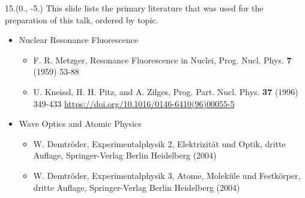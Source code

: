 \begin{textblock}{15.}(0., -5.)
    This slide lists the primary literature that was used for the preparation of this talk, ordered by topic.

    \begin{itemize}
        \item Nuclear Resonance Fluorescence
        \begin{itemize}
            \item F. R. Metzger, Resonance Fluorescence in Nuclei, Prog. Nucl. Phys. \textbf{7} (1959) 53-88
            \item U. Kneissl, H. H. Pitz, and A. Zilges, Prog. Part. Nucl. Phys. \textbf{37} (1996) 349-433 \url{https://doi.org/10.1016/0146-6410(96)00055-5}
        \end{itemize}
        \item Wave Optics and Atomic Physics
        \begin{itemize}
            \item W. Demtr\"oder, Experimentalphysik 2, Elektrizit\"at und Optik, dritte Auflage, Springer-Verlag Berlin Heidelberg (2004)
            \item W. Demtr\"oder, Experimentalphysik 3, Atome, Molek\"ule und Festk\"orper, dritte Auflage, Springer-Verlag Berlin Heidelberg (2004)
        \end{itemize}        
    \end{itemize}
\end{textblock}